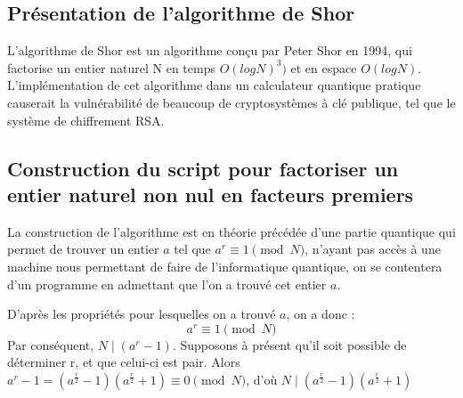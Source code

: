 \documentclass[12pt]{article}
\begin{document}
\subsection{Présentation de l'algorithme de Shor}
L'algorithme de Shor est un algorithme conçu par Peter Shor en 1994, qui factorise un entier naturel N en temps $O(log N)^3)$ et en espace $O(log N)$.
L'implémentation de cet algorithme dans un calculateur quantique pratique causerait la vulnérabilité de beaucoup de cryptosystèmes à clé publique, tel que le système de chiffrement RSA.

\subsection{Construction du script pour factoriser un entier naturel non nul en facteurs premiers}
La construction de l'algorithme est en théorie précédée d'une partie quantique qui permet de trouver un entier $a$ tel que $a^r \equiv 1 \pmod N$, n'ayant pas accès à une machine nous permettant de faire de l'informatique quantique, on se contentera d'un programme en admettant que l'on a trouvé cet entier $a$.

D'après les propriétés pour lesquelles on a trouvé $a$, on a donc :
$$a^r \equiv 1 \pmod N$$
Par conséquent, $N \mid (a^r -1)$. Supposons à présent qu'il soit possible de déterminer r, et que celui-ci est pair. Alors
\\
$a^r -1 = (a^{\frac{r}{2}} -1)(a^{\frac{r}{2}}+1) \equiv 0 \pmod N$, d'où $N \mid (a^{\frac{r}{2}} -1)(a^{\frac{r}{2}}+1)$
\end{document}

